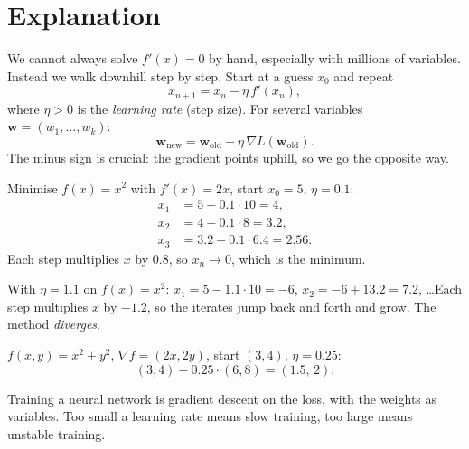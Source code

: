 \label{ch:gd}

\section*{Explanation}
We cannot always solve $f'(x)=0$ by hand, especially with millions of variables. Instead we walk downhill step by step. Start at a guess $x_0$ and repeat
\[
x_{n+1}=x_n-\eta\,f'(x_n),
\]
where $\eta>0$ is the \emph{learning rate} (step size). For several variables $\mathbf w=(w_1,\dots,w_k)$:
\[
\mathbf w_{\text{new}}=\mathbf w_{\text{old}}-\eta\,\nabla L(\mathbf w_{\text{old}}).
\]
The minus sign is crucial: the gradient points uphill, so we go the opposite way.

\begin{example}
Minimise $f(x)=x^2$ with $f'(x)=2x$, start $x_0=5$, $\eta=0.1$:
\begin{align*}
x_1&=5-0.1\cdot10=4,\\
x_2&=4-0.1\cdot 8=3.2,\\
x_3&=3.2-0.1\cdot6.4=2.56.
\end{align*}
Each step multiplies $x$ by $0.8$, so $x_n\to0$, which is the minimum.
\end{example}

\begin{example}
With $\eta=1.1$ on $f(x)=x^2$: $x_1=5-1.1\cdot10=-6$, $x_2=-6+13.2=7.2$, \dots Each step multiplies $x$ by $-1.2$, so the iterates jump back and forth and grow. The method \emph{diverges}.
\end{example}

\begin{example}
$f(x,y)=x^2+y^2$, $\nabla f=(2x,2y)$, start $(3,4)$, $\eta=0.25$:
\[
(3,4)-0.25\cdot(6,8)=(1.5,\,2).
\]
\end{example}

\begin{aibox}
Training a neural network is gradient descent on the loss, with the weights as variables. Too small a learning rate means slow training, too large means unstable training.
\end{aibox}


